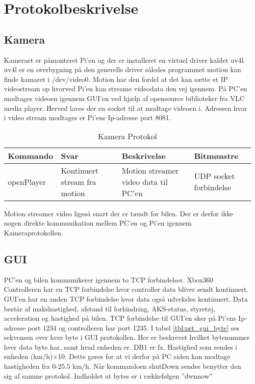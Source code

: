 \section{Protokolbeskrivelse}

\subsection{Kamera}

Kameraet er påmonteret Pi'en og der er installeret en virtuel driver kaldet uv4l. uv4l er en overbygning på den generelle driver således programmet motion kan finde kamaret i /dev/video0. Motion har den fordel at det kan sætte et IP videostream op hvorved Pi’en kan streame videodata den vej igennem. På PC'en modtages videoen igennem GUI'en ved hjælp af opensource biblioteker fra VLC media player. Herved laves der en socket til at modtage videoen i. Adressen hvor i video stream modtages er Pi'ens Ip-adresse port 8081.

\begin{table}[ht]
\begin{tabularx}{\textwidth}{| Z | Z | Z | Z |} \hline

\textbf{Kommando} 						&
\textbf{Svar}							&
\textbf{Beskrivelse}					&
\textbf{Bitmønstre}						\\ \hline

openPlayer								&
Kontinuert stream fra motion			&
Motion streamer video data til PC'en	&
UDP socket forbindelse					\\ \hline

\end{tabularx}
\caption{Kamera Protokol}
\label{tbl:prt_cam}
\end{table}

Motion streamer video ligeså snart der er tændt for bilen. Der er derfor ikke nogen direkte kommunikation mellem PC'en og Pi'en igennem Kameraprotokollen.


\subsection{GUI}

PC'en og bilen kommunikerer igennem to TCP forbindelser. Xbox360 Controlleren har en TCP forbindelse hvor controller data bliver sendt kontinuert. GUI'en har en anden TCP forbindelse hvor data også udveksles kontinuert. Data består af makshastighed, afstand til forhindring, AKS-status,  styretøj, acceleration og hastighed på bilen. TCP forbindelse til GUI'en sker på Pi'ens Ip-adresse port 1234 og controlleren har port 1235.
I tabel \ref{tbl:prt_gui_byte} ses sekvensen over hver byte i GUI protokollen. Her er beskrevet hvilket bytenummer hver data byte har, samt hvad enheden er. DB1 er fx. Hastighed som sendes i enheden (km/h)$\times$10. Dette gøres for at vi derfor på PC siden kan modtage hastigheden fra 0-25.5 km/h. Når kommandoen shutDown sendes benytter den sig af samme protokol. Indholdet at bytes er i rækkefølgen ''dwnnow''

